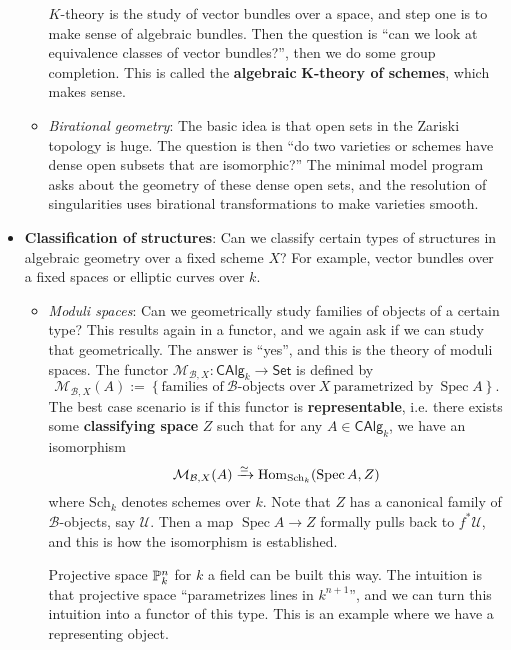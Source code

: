 \begin{itemize}
\begin{itemize}
                $K$-theory is the study of vector bundles over a space, and step one is to make sense of algebraic bundles. Then the question is ``can we look at equivalence classes of vector bundles?'', then we do some group completion. This is called the \textbf{algebraic} $\mathbf K$\textbf{-theory of schemes}, which makes sense.
            \item \emph{Birational geometry}: The basic idea is that open sets in the Zariski topology is huge. The question is then ``do two varieties or schemes have dense open subsets that are isomorphic?'' The minimal model program asks about the geometry of these dense open sets, and the resolution of singularities uses birational transformations to make varieties smooth.
        \end{itemize}
    \item \textbf{Classification of structures}: Can we classify certain types of structures in algebraic geometry over a fixed scheme $X$? For example, vector bundles over a fixed spaces or elliptic curves over $k$.
        \begin{itemize}
            \item \emph{Moduli spaces}: Can we geometrically study families of objects of a certain type? This results again in a functor, and we again ask if we can study that geometrically. The answer is ``yes'', and this is the theory of moduli spaces. The functor $\mathcal{M} _{\mathcal{B} ,X}\colon \mathsf{CAlg} _k \to \mathsf{Set} $ is defined by \[
                    \mathcal{M} _{\mathcal{B} ,X}(A):=
                    \left\{  \text{families of} \ \mathcal{B}\text{-objects over} \ X \ \text{parametrized by} \ \operatorname{Spec}A\right\} .
            \] The best case scenario is if this functor is \textbf{representable}, i.e. there exists some \textbf{classifying space} $Z$ such that for any $A \in \mathsf{CAlg} _k$, we have an isomorphism \[
            \mathcal{M} _{\mathcal{B} ,X}(A) \xrightarrow{\simeq } \Hom_{\mathrm{Sch}_k}(\operatorname{Spec} A, Z)
            \] where $\mathrm{Sch}_k$ denotes schemes over $k$. Note that $Z$ has a canonical family of $\mathcal{B} $-objects, say $\mathcal{U} $. Then a map $\operatorname{Spec}A\to Z$ formally pulls back to $f^*\mathcal{U} $, and this is how the isomorphism is established.
            \begin{example}
                Projective space $\P^n _k$ for $k$ a field can be built this way. The intuition is that projective space ``parametrizes lines in $k^{n+1}$'', and we can turn this intuition into a functor of this type. This is an example where we have a representing object.



\end{example}
\end{itemize}
\end{itemize}

